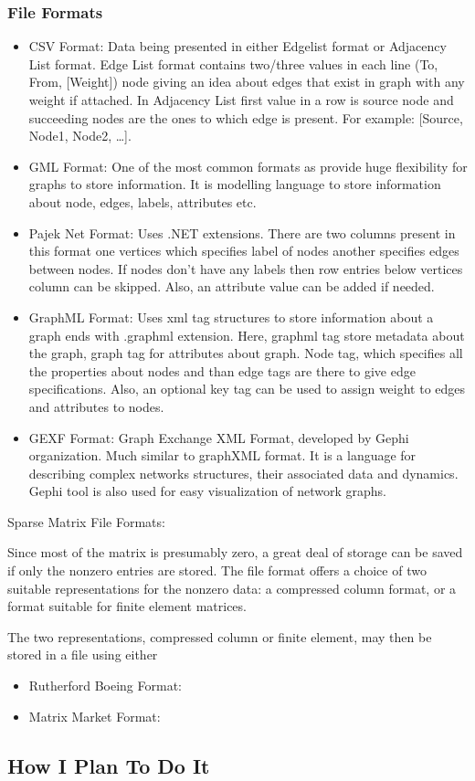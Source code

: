 \subsubsection{File Formats}
\begin{itemize}
    \item CSV Format: Data being presented in either Edgelist format or Adjacency List format. Edge List format contains two/three values in each line (To, From, [Weight]) node giving an idea about edges that exist in graph with any weight if attached. In Adjacency List first value in a row is source node and succeeding nodes are the ones to which edge is present. For example: [Source, Node1, Node2, …].
    \item GML Format: One of the most common formats as provide huge flexibility for graphs to store information. It is modelling language to store information about node, edges, labels, attributes etc.
    \item Pajek Net Format: Uses .NET extensions. There are two columns present in this format one vertices which specifies label of nodes another specifies edges between nodes. If nodes don’t have any labels then row entries below vertices column can be skipped. Also, an attribute value can be added if needed.
    \item GraphML Format: Uses xml tag structures to store information about a graph ends with .graphml extension. Here, graphml tag store metadata about the graph, graph tag for attributes about graph. Node tag, which specifies all the properties about nodes and than edge tags are there to give edge specifications. Also, an optional key tag can be used to assign weight to edges and attributes to nodes.
    \item GEXF Format: Graph Exchange XML Format, developed by Gephi organization. Much similar to graphXML format. It is a language for describing complex networks structures, their associated data and dynamics. Gephi tool is also used for easy visualization of network graphs.
\end{itemize}

\hrulefill

Sparse Matrix File Formats:

Since most of the matrix is presumably zero, a great deal of storage can be saved if only the nonzero entries are stored. The file format offers a choice of two suitable representations for the nonzero data: a compressed column format, or a format suitable for finite element matrices.

The two representations, compressed column or finite element, may then be stored in a file using either
\begin{itemize}
    \item Rutherford Boeing Format: 
    \item Matrix Market Format:
\end{itemize}


\subsection{How I Plan To Do It}
